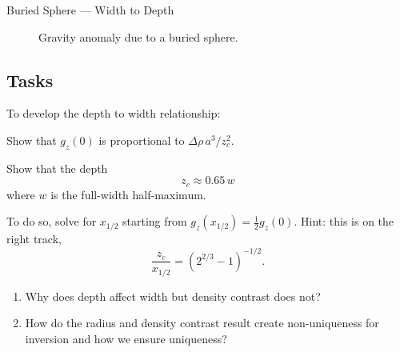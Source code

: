 \begin{activity}{Buried Sphere --- Width to Depth}
\begin{figure}[h]
  \centering
  \caption{Gravity anomaly due to a buried sphere.}
  \label{fig:gravity_sphere}
\end{figure}

\subsection*{Tasks}
To develop the depth to width relationship:
\begin{questions}
  Show that $g_z(0)$ is proportional to $\Delta\rho\,a^3/z_c^2$.
  \answerbox

  Show that the depth
  \[
    z_c \approx 0.65\, w
  \]
  where \(w\) is the full-width half-maximum.
  
  To do so, solve for $x_{1/2}$ starting from $g_z(x_{1/2}) = \tfrac{1}{2} g_z(0)$.  Hint: this is on the right track,
  \[
    \frac{z_c}{x_{1/2}} = (2^{2/3} - 1)^{-1/2}.
  \]
  \answerbox[320pt]

  \clearpage
    \begin{enumerate}[label=\alph*]
      \item Why does depth affect width but density contrast does not?  
      \answerbox{36pt}

      \item How do the radius and density contrast result create non-uniqueness for inversion and how we ensure uniqueness?
      \answerbox{36pt}


\end{enumerate}
\end{questions}
\end{activity}
